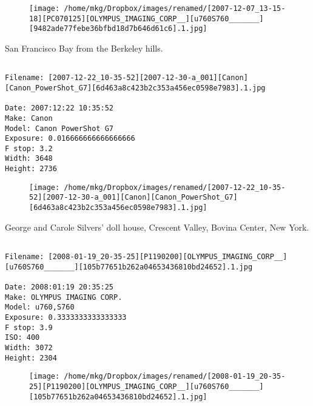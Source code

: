 \begin{figure}
\texttt{[image: /home/mkg/Dropbox/images/renamed/[2007-12-07\_13-15-18][PC070125][OLYMPUS\_IMAGING\_CORP\_\_][u760S760\_\_\_\_\_\_\_][9482ade77febe36bfbd18d7b646d61c6].1.jpg]}
\end{figure}
    
\clearpage
\onecolumn
\noindent San Francisco Bay from the Berkeley hills.
\noindent
\begin{lstlisting}

Filename: [2007-12-22_10-35-52][2007-12-30-a_001][Canon][Canon_PowerShot_G7][6d463a8c423b2c353a456ec0598e7983].1.jpg

Date: 2007:12:22 10:35:52
Make: Canon
Model: Canon PowerShot G7
Exposure: 0.016666666666666666
F stop: 3.2
Width: 3648
Height: 2736
\end{lstlisting}
\clearpage

\begin{figure}
\texttt{[image: /home/mkg/Dropbox/images/renamed/[2007-12-22\_10-35-52][2007-12-30-a\_001][Canon][Canon\_PowerShot\_G7][6d463a8c423b2c353a456ec0598e7983].1.jpg]}
\end{figure}
    
\clearpage
\onecolumn
\noindent George and Carole Silvers' doll house, Crescent Valley, Bovina Center, New York.
\noindent
\begin{lstlisting}

Filename: [2008-01-19_20-35-25][P1190200][OLYMPUS_IMAGING_CORP__][u760S760_______][105b77651b262a04653436810bd24652].1.jpg

Date: 2008:01:19 20:35:25
Make: OLYMPUS IMAGING CORP.  
Model: u760,S760       
Exposure: 0.3333333333333333
F stop: 3.9
ISO: 400
Width: 3072
Height: 2304
\end{lstlisting}
\clearpage

\begin{figure}
\texttt{[image: /home/mkg/Dropbox/images/renamed/[2008-01-19\_20-35-25][P1190200][OLYMPUS\_IMAGING\_CORP\_\_][u760S760\_\_\_\_\_\_\_][105b77651b262a04653436810bd24652].1.jpg]}
\end{figure}
    
